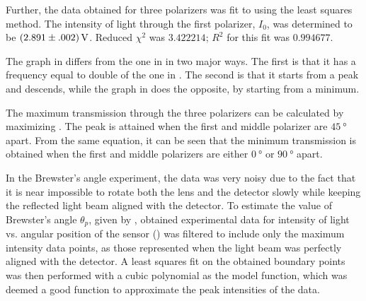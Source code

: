 \begin{paper}
	
	Further, the data obtained for three polarizers was fit to \eqThreePolarizers using the least squares method. The intensity of light through the first polarizer, \( I_0 \), was determined to be \( \left(2.891 \pm .002\right) \si{\volt} \). Reduced \( \chi^2 \) was \( 3.422214 \); \( R^2 \) for this fit was \( 0.994677 \).
	
	The graph in \figExerciseTwoFit differs from the one in \figExerciseOneFit in two major ways. The first is that it has a frequency equal to double of the one in \figExerciseOneFit. The second is that it starts from a peak and descends, while the graph in \figExerciseOneFit does the opposite, by starting from a minimum.
	
	The maximum transmission through the three polarizers can be calculated by maximizing \eqThreePolarizers. The peak is attained when the first and middle polarizer are $\SI{45}{\degree}$ apart. From the same equation, it can be seen that the minimum transmission is obtained when the first and middle polarizers are either $\SI{0}{\degree}$ or $\SI{90}{\degree}$ apart.
	
	In the Brewster's angle experiment, the data was very noisy due to the fact that it is near impossible to rotate both the lens and the detector slowly while keeping the reflected light beam aligned with the detector. To estimate the value of Brewster's angle \( \theta_p \), given by \eqPolarizingAngle, obtained experimental data for intensity of light vs. angular position of the sensor (\figExerciseThreeData) was filtered to include only the maximum intensity data points, as those represented when the light beam was perfectly aligned with the detector. A least squares fit on the obtained boundary points was then performed with a cubic polynomial as the model function, which was deemed a good function to approximate the peak intensities of the data.
	

\end{paper}
